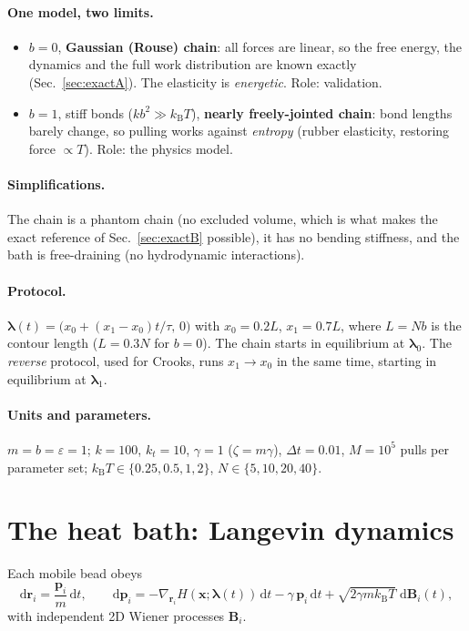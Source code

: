 \documentclass[11pt,a4paper]{article}
\newcommand{\kT}{k_{\mathrm B}T}
\newcommand{\dd}{\mathrm{d}}
\newcommand{\lam}{\bm{\lambda}}
\begin{document}
\paragraph{One model, two limits.}
\begin{itemize}[leftmargin=*]
\item $b=0$, \textbf{Gaussian (Rouse) chain}: all forces are linear, so the free energy, the dynamics
and the full work distribution are known exactly (Sec.~\ref{sec:exactA}). The elasticity is
\emph{energetic}. Role: validation.
\item $b=1$, stiff bonds ($kb^2\gg\kT$), \textbf{nearly freely-jointed chain}: bond lengths barely
change, so pulling works against \emph{entropy} (rubber elasticity, restoring force $\propto T$).
Role: the physics model.
\end{itemize}
\paragraph{Simplifications.} The chain is a phantom chain (no excluded volume, which is what makes
the exact reference of Sec.~\ref{sec:exactB} possible), it has no bending stiffness, and the bath
is free-draining (no hydrodynamic interactions).

\paragraph{Protocol.} $\lam(t)=\big(x_0+(x_1-x_0)t/\tau,\,0\big)$ with $x_0=0.2L$, $x_1=0.7L$, where
$L=Nb$ is the contour length ($L=0.3N$ for $b=0$). The chain starts in equilibrium at $\lam_0$. The
\emph{reverse} protocol, used for Crooks, runs $x_1\to x_0$ in the same time, starting in equilibrium at $\lam_1$.

\paragraph{Units and parameters.} $m=b=\varepsilon=1$; $k=100$, $k_t=10$, $\gamma=1$
($\zeta=m\gamma$), $\Delta t=0.01$, $M=10^5$ pulls per parameter set; $\kT\in\{0.25,0.5,1,2\}$,
$N\in\{5,10,20,40\}$.

\section{The heat bath: Langevin dynamics}
\label{sec:bath}

Each mobile bead obeys
\begin{equation}
\dd\bm r_i=\frac{\bm p_i}{m}\,\dd t,\qquad
\dd\bm p_i = -\nabla_{\bm r_i}H(\bm x;\lam(t))\,\dd t - \gamma\,\bm p_i\,\dd t
 + \sqrt{2\gamma m\kT}\;\dd\bm B_i(t),
\label{eq:langevin}
\end{equation}
with independent 2D Wiener processes $\bm B_i$.
\end{document}
